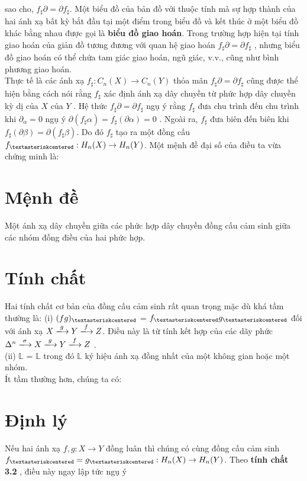 sao cho, \( f_{\sharp}\partial = \partial f_{\sharp}\). Một biểu đồ của bản đồ với thuộc tính mà sự hợp thành của hai ánh xạ bất kỳ bắt đầu tại một điểm trong biểu đồ và kết thúc ở một biểu đồ khác bằng nhau được gọi là \textbf{biểu đồ giao hoán}. Trong trường hợp hiện tại tính giao hoán của giản đồ tương đương với quan hệ giao hoán \( f_{\sharp}\partial = \partial f_{\sharp}\) , nhưng biểu đồ giao hoán có thể chứa tam giác giao hoán, ngũ giác, v.v., cũng như bình phương giao hoán. \\
\indent Thực tế là các ánh xạ \(f_{\sharp} : C_n(X) \rightarrow C_n(Y)\) thỏa mãn \( f_{\sharp}\partial = \partial f_{\sharp}\) cũng được thể hiện bằng cách nói rằng \(f_{\sharp}\) xác định ánh xạ dây chuyền từ phức hợp dây chuyền kỳ dị của \(X\) của \(Y\) . Hệ thức \( f_{\sharp}\partial = \partial f_{\sharp}\) ngụ ý rằng \(f_{\sharp}\) đưa chu trình đến chu trình khi \(\partial_{\alpha} = 0\) ngụ ý \(\partial(f_{\sharp}\alpha) = f_{\sharp}(\partial\alpha) = 0\) . Ngoài ra, \(f_{\sharp}\) đưa biên đến biên khi \(f_{\sharp} (\partial\beta) = \partial(f_{\sharp}\beta)\). Do đó \(f_{\sharp}\) tạo ra một đồng cấu \(f_{\textasteriskcentered} : H_n(X) \rightarrow H_n(Y)\). Một mệnh đề đại số của điều ta vừa chứng minh là:

\section{Mệnh đề}
\indent Một ánh xạ dây chuyền giữa các phức hợp dây chuyền đồng cấu cảm sinh giữa các nhóm đồng điều của hai phức hợp.

\section{Tính chất}
\indent Hai tính chất cơ bản của  đồng cấu cảm sinh rất quan trọng mặc dù khá tầm thường là:
(i)  \((fg)_{\textasteriskcentered}\) = \(f_{\textasteriskcentered}g_{\textasteriskcentered}\) đối với ánh xạ \(X \xlongrightarrow[]{g} Y \xlongrightarrow[]{f} Z \). Điều này là  từ tính kết hợp của các dãy phức \(\Delta^{n} \xlongrightarrow[]{\sigma} X \xlongrightarrow[]{g} Y \xlongrightarrow[]{f} Z\) . \\
(ii)  \(\mathds{L}\) = \(\mathds{L}\) trong đó \(\mathds{L}\) ký hiệu ánh xạ đồng nhất của một không gian hoặc một nhóm. \\
Ít tầm thường hơn, chúng ta có:

\section{Định lý}
\indent Nếu   hai   ánh   xạ   \(f , g : X \rightarrow Y\)   đồng   luân  thì   chúng   có   cùng   đồng   cấu   cảm   sinh \( f_{\textasteriskcentered} = g_{\textasteriskcentered} : H_n(X) \rightarrow H_n(Y)\).
Theo \textbf{tính chất 3.2} , điều này ngay lập tức ngụ ý

